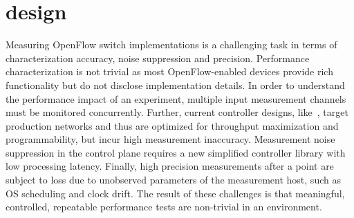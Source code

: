 
\section{\oflops design}\label{sec:oflops-design}

Measuring OpenFlow switch implementations is a challenging task in terms of
characterization accuracy, noise suppression and precision.  Performance
characterization is not trivial as most OpenFlow-enabled devices provide rich
functionality but do not disclose implementation details. In order to understand
the performance impact of an experiment, multiple input measurement channels
must be monitored concurrently. Further, current controller designs,
like~\cite{Gude08,SNAC}, target production networks and thus are optimized for
throughput maximization and programmability, but incur high measurement
inaccuracy. Measurement noise suppression in the control plane requires a new
simplified \of controller library with low processing latency. Finally, high
precision measurements after a point are subject to loss due to unobserved
parameters of the measurement host, such as OS scheduling and clock drift. The
result of these challenges is that meaningful, controlled, repeatable
performance tests are non-trivial in an \of environment.



